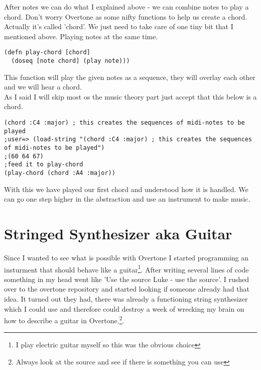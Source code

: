 After notes we can do what I explained above - we can combine notes to play a chord. Don't worry Overtone as some nifty functions to help us create a chord. Actually it's called 'chord'.
We just need to take care of one tiny bit that I mentioned above. Playing notes at the same time.
\begin{lstlisting}
(defn play-chord [chord]
  (doseq [note chord] (play note)))
\end{lstlisting}
This function will play the given notes as a sequence, they will overlay each other and we will hear a chord.\\

As I said I will skip most os the music theory part just accept that this below is a chord.
\begin{lstlisting}
(chord :C4 :major) ; this creates the sequences of midi-notes to be played
;user=> (load-string "(chord :C4 :major) ; this creates the sequences of midi-notes to be played")
;(60 64 67)
;feed it to play-chord
(play-chord (chord :A4 :major))
\end{lstlisting} 

With this we have played our first chord and understood how it is handled. We can go one step higher in the abstraction and use an instrument to make music.

\section{Stringed Synthesizer aka Guitar}
Since I wanted to see what is possible with Overtone I started programming an insturment that should behave like a guitar\footnote{I play electric guitar myself so this was the obvious choice}. After writing several lines of code something in my head went like 'Use the source Luke - use the source'. I rushed over to the overtone repository\cite{osr} and started looking if someone already had that idea. It turned out they had, there was already a functioning string synthesizer which I could use and therefore could destroy a week of wrecking my brain on how to describe a guitar in Overtone.\footnote{Always look at the source and see if there is something you can use}.

